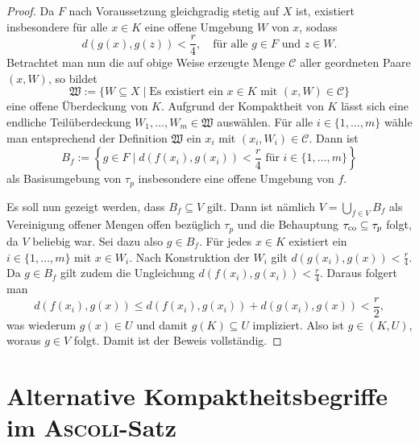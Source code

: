 \begin{proof}
  Da $F$ nach Voraussetzung gleichgradig stetig auf $X$ ist, existiert insbesondere für alle $x \in K$ eine offene Umgebung $W$ von $x$, sodass 
  \begin{displaymath}
    d(g(x),g(z)) < \frac{r}{4}, \quad \text{für alle $g \in F$ und $z \in W$}.
  \end{displaymath}
  Betrachtet man nun die auf obige Weise erzeugte Menge $\mathcal{C}$ aller geordneten Paare $(x,W)$, so bildet
  \begin{displaymath}
    \mathfrak{W} := \{W \subseteq X \mid \text{Es existiert ein $x \in K$ mit $(x,W) \in \mathcal{C}$} \}
  \end{displaymath}
  eine offene Überdeckung von $K$.
  Aufgrund der Kompaktheit von $K$ lässt sich eine endliche Teilüberdeckung $W_1,\dots,W_m \in \mathfrak{W}$ auswählen.
  Für alle $i \in \{ 1,\dots,m\}$ wähle man entsprechend der Definition $\mathfrak{W}$ ein $x_i$ mit $(x_i,W_i) \in \mathcal{C}$.
  Dann ist
  \begin{displaymath}
    B_f := \left\{ g \in F \mid d(f(x_i),g(x_i)) < \frac{r}{4} \text{ für } i \in \{ 1,\dots,m\}\right\}
  \end{displaymath}
  als Basisumgebung von $\tau_p$ insbesondere eine offene Umgebung von $f$.

  Es soll nun gezeigt werden, dass $B_f \subseteq V$ gilt.
  Dann ist nämlich $V = \bigcup_{f \in V} B_f$ als Vereinigung offener Mengen offen bezüglich $\tau_p$ und die Behauptung $\tau_{\mathrm{co}} \subseteq \tau_p$ folgt, da $V$ beliebig war.
  Sei dazu also $g \in B_f$.
  Für jedes $x \in K$ existiert ein $i \in \{1,\dots,m\}$ mit $x \in W_i$.
  Nach Konstruktion der $W_i$ gilt $d(g(x_i),g(x)) < \frac{r}{4}$.
  Da $g \in B_f$ gilt zudem die Ungleichung $d(f(x_i),g(x_i)) < \frac{r}{4}$.
  Daraus folgert man
  \begin{displaymath}
    d(f(x_i),g(x)) \leq d(f(x_i),g(x_i)) + d(g(x_i),g(x)) < \frac{r}{2},
  \end{displaymath}
  was wiederum $g(x) \in U$ und damit $g(K) \subseteq U$ impliziert. 
  Also ist $g \in (K,U)$, woraus $g \in V$ folgt.
  Damit ist der Beweis vollständig.
\end{proof}

\section{Alternative Kompaktheitsbegriffe im \textsc{Ascoli}-Satz}

